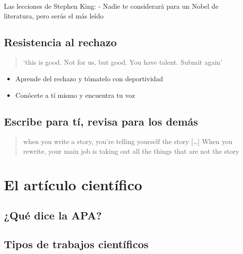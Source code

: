\documentclass[
]{book}
\providecommand{\tightlist}{%
  \setlength{\itemsep}{0pt}\setlength{\parskip}{0pt}}
\begin{document}
Las lecciones de Stephen King:
- Nadie te considerará para un Nobel de literatura, pero serás el más leído

\hypertarget{resistencia-al-rechazo}{%
\section{Resistencia al rechazo}\label{resistencia-al-rechazo}}

\begin{quote}
`this is good. Not for us, but good. You have talent. Submit again'
\end{quote}

\begin{itemize}
\tightlist
\item
  Aprende del rechazo y tómatelo con deportividad
\item
  Conócete a tí mismo y encuentra tu voz
\end{itemize}

\hypertarget{escribe-para-tuxed-revisa-para-los-demuxe1s}{%
\section{Escribe para tí, revisa para los demás}\label{escribe-para-tuxed-revisa-para-los-demuxe1s}}

\begin{quote}
when you write a story, you're telling yourself the story {[}\ldots{]} When you rewrite, your main job is taking out all the things that are not the story
\end{quote}

\hypertarget{el-artuxedculo-cientuxedfico}{%
\chapter{El artículo científico}\label{el-artuxedculo-cientuxedfico}}

\hypertarget{quuxe9-dice-la-apa}{%
\section{¿Qué dice la APA?}\label{quuxe9-dice-la-apa}}

\hypertarget{tipos-de-trabajos-cientuxedficos}{%
\section{Tipos de trabajos científicos}\label{tipos-de-trabajos-cientuxedficos}}
\end{document}
